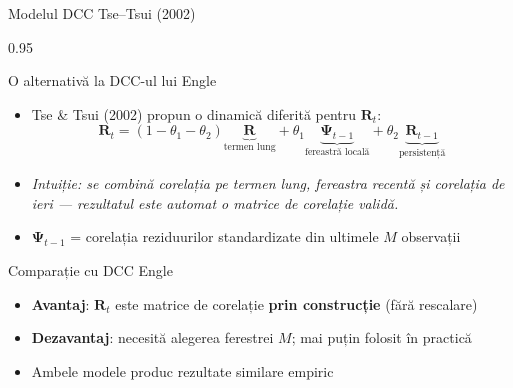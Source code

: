 \documentclass[9pt, aspectratio=169, t]{beamer}
\begin{document}
\begin{frame}{Modelul DCC Tse--Tsui (2002)}
    \begin{cminipage}{0.95\textwidth}
    {\footnotesize
    \begin{block}{O alternativă la DCC-ul lui Engle}
        \begin{itemize}\setlength{\itemsep}{0pt}
            \item Tse \& Tsui (2002) propun o dinamică diferită pentru $\mathbf{R}_t$:
            \[
                \mathbf{R}_t = (1 - \theta_1 - \theta_2)\underbrace{\mathbf{R}}_{\text{termen lung}} + \theta_1 \underbrace{\boldsymbol{\Psi}_{t-1}}_{\text{fereastră locală}} + \theta_2 \underbrace{\mathbf{R}_{t-1}}_{\text{persistență}}
            \]
            \item \textit{Intuiție: se combină corelația pe termen lung, fereastra recentă și corelația de ieri --- rezultatul este automat o matrice de corelație validă.}
            \item $\boldsymbol{\Psi}_{t-1}$ = corelația reziduurilor standardizate din ultimele $M$ observații
        \end{itemize}
    \end{block}
    \begin{block}{Comparație cu DCC Engle}
        \begin{itemize}\setlength{\itemsep}{0pt}
            \item \textbf{Avantaj}: $\mathbf{R}_t$ este matrice de corelație \textbf{prin construcție} (fără rescalare)
            \item \textbf{Dezavantaj}: necesită alegerea ferestrei $M$; mai puțin folosit în practică
            \item Ambele modele produc rezultate similare empiric
        \end{itemize}
    \end{block}
    }
    \end{cminipage}
\end{frame}
\end{document}
